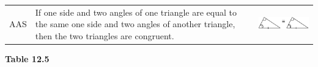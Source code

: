 \begin{center}
\begin{xtabular*}{\mytablewidth}[t]{|p{10\mystarwidth}|p{10\mystarwidth}|p{10\mystarwidth}|}
    
        AAS &
    
    
        If one side and two angles of one triangle are equal to the same one side and two angles of another triangle, then the two triangles are congruent. &
    
    
        
                    
    \setcounter{subfigure}{0}

\label{m39368*id318178}
    \begin{center}
    \label{m39368*id318178!!!underscore!!!media}\label{m39368*id318178!!!underscore!!!printimage}\includegraphics[width=.25\columnwidth]{col11306.imgs/m39368_MG10C13_034.png} %
        
      \vspace{2pt}
    \vspace{.1in}
    
    \end{center}



    \addtocounter{footnote}{-0}
    
     \tabularnewline{}
    \end{xtabular*}
      \end{center}
    \begin{center}{\small\bfseries Table 12.5}\end{center}
    
    \addtocounter{footnote}{-0}
    
    \par
  

